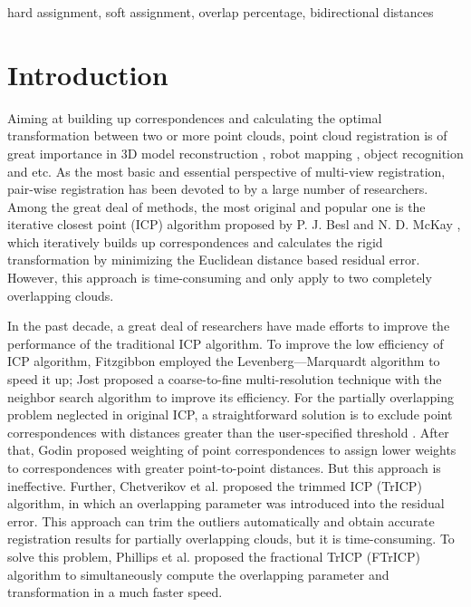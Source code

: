 \documentclass[review]{elsarticle}
\begin{document}
\begin{frontmatter}
\begin{keyword}
hard assignment, soft assignment, overlap percentage, bidirectional distances
\end{keyword}

\end{frontmatter}


\section{Introduction}
Aiming at building up correspondences and calculating the optimal transformation between two or more point clouds, point cloud registration is of great importance in 3D model reconstruction \cite{New15}, robot mapping \cite{Shiratori15,Yu15}, object recognition \cite{Abate07, Held16} and etc. As the most basic and essential perspective of multi-view registration, pair-wise registration has been devoted to by a large number of researchers.
Among the great deal of methods, the most original and popular one is the iterative closest point (ICP) algorithm proposed by P. J. Besl and N. D. McKay \cite{Besl92}, which iteratively builds up correspondences and calculates the rigid transformation by minimizing the Euclidean distance based residual error. However, this approach is time-consuming and only apply to two completely overlapping clouds.

In the past decade, a great deal of researchers have made efforts to improve the performance of the traditional ICP algorithm. To improve the low efficiency of ICP algorithm, Fitzgibbon \cite{Fitzgibbon03} employed the Levenberg---Marquardt algorithm to speed it up; Jost \cite{Jost03} proposed a coarse-to-fine multi-resolution technique with the neighbor search algorithm to improve its efficiency. For the partially overlapping problem neglected in original ICP, a straightforward solution is to exclude point correspondences with distances greater than the user-specified threshold \cite{Rusinkiewicz01}. After that, Godin \cite{Godin94} proposed weighting of point correspondences to assign lower weights to correspondences with greater point-to-point distances. But this approach is ineffective. Further, Chetverikov et al.\cite{Chet05} proposed the trimmed ICP (TrICP) algorithm, in which an overlapping parameter was introduced into the residual error. This approach can trim the outliers automatically and obtain accurate registration results for partially overlapping clouds, but it is time-consuming. To solve this problem, Phillips et al.\cite{Phillips07} proposed the fractional TrICP (FTrICP) algorithm to simultaneously compute the overlapping parameter and transformation in a much faster speed.
\end{document}
